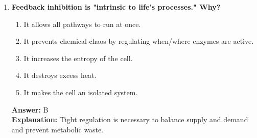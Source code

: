 \documentclass[11pt, a4paper]{article}
\begin{document}
\begin{enumerate}[leftmargin=*, label=\arabic*.]
\item \textbf{Feedback inhibition is "intrinsic to life's processes." Why?}
\begin{enumerate}[label=\Alph*.]
    \item It allows all pathways to run at once.
    \item It prevents chemical chaos by regulating when/where enzymes are active.
    \item It increases the entropy of the cell.
    \item It destroys excess heat.
    \item It makes the cell an isolated system.
\end{enumerate}
\textbf{Answer:} B \\
\textbf{Explanation:} Tight regulation is necessary to balance supply and demand and prevent metabolic waste.

\end{enumerate}
\end{document}
